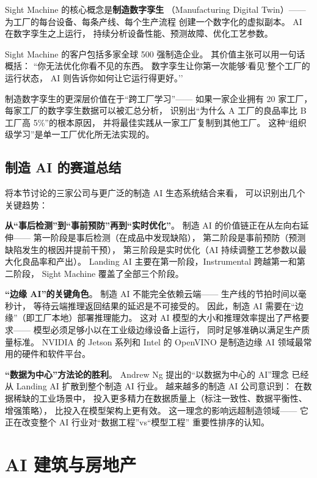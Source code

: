 Sight Machine 的核心概念是\textbf{制造数字孪生}
（Manufacturing Digital Twin）——
为工厂的每台设备、每条产线、每个生产流程
创建一个数字化的虚拟副本。
AI 在数字孪生之上运行，
持续分析设备性能、预测故障、优化工艺参数。

Sight Machine 的客户包括多家全球 500 强制造企业。
其价值主张可以用一句话概括：
``你无法优化你看不见的东西。
数字孪生让你第一次能够`看见'整个工厂的运行状态，
AI 则告诉你如何让它运行得更好。''

制造数字孪生的更深层价值在于``跨工厂学习''——
如果一家企业拥有 20 家工厂，
每家工厂的数字孪生数据可以被汇总分析，
识别出``为什么 A 工厂的良品率比 B 工厂高 5\%''的根本原因，
并将最佳实践从一家工厂复制到其他工厂。
这种``组织级学习''是单一工厂优化所无法实现的。

\subsection{制造 AI 的赛道总结}

将本节讨论的三家公司与更广泛的制造 AI 生态系统结合来看，
可以识别出几个关键趋势：

\textbf{从``事后检测''到``事前预防''再到``实时优化''}。
制造 AI 的价值链正在从左向右延伸——
第一阶段是事后检测（在成品中发现缺陷），
第二阶段是事前预防（预测缺陷发生的根因并提前干预），
第三阶段是实时优化（AI 持续调整工艺参数以最大化良品率和产出）。
Landing AI 主要在第一阶段，Instrumental 跨越第一和第二阶段，
Sight Machine 覆盖了全部三个阶段。

\textbf{``边缘 AI''的关键角色}。
制造 AI 不能完全依赖云端——
生产线的节拍时间以毫秒计，
等待云端推理返回结果的延迟是不可接受的。
因此，制造 AI 需要在``边缘''（即工厂本地）部署推理能力。
这对 AI 模型的大小和推理效率提出了严格要求——
模型必须足够小以在工业级边缘设备上运行，
同时足够准确以满足生产质量标准。
NVIDIA 的 Jetson 系列和 Intel 的 OpenVINO
是制造边缘 AI 领域最常用的硬件和软件平台。

\textbf{``数据为中心''方法论的胜利}。
Andrew Ng 提出的``以数据为中心的 AI''理念
已经从 Landing AI 扩散到整个制造 AI 行业。
越来越多的制造 AI 公司意识到：
在数据稀缺的工业场景中，
投入更多精力在数据质量上（标注一致性、数据平衡性、增强策略），
比投入在模型架构上更有效。
这一理念的影响远超制造领域——
它正在改变整个 AI 行业对``数据工程''vs``模型工程''
重要性排序的认知。


\section{AI 建筑与房地产}
\label{sec:ent-construction}

